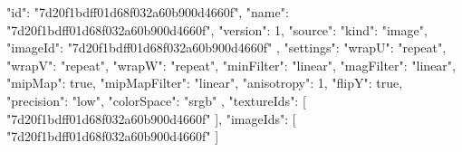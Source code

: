 {
  "id": "7d20f1bdff01d68f032a60b900d4660f",
  "name": "7d20f1bdff01d68f032a60b900d4660f",
  "version": 1,
  "source": {
    "kind": "image",
    "imageId": "7d20f1bdff01d68f032a60b900d4660f"
  },
  "settings": {
    "wrapU": "repeat",
    "wrapV": "repeat",
    "wrapW": "repeat",
    "minFilter": "linear",
    "magFilter": "linear",
    "mipMap": true,
    "mipMapFilter": "linear",
    "anisotropy": 1,
    "flipY": true,
    "precision": "low",
    "colorSpace": "srgb"
  },
  "textureIds": [
    "7d20f1bdff01d68f032a60b900d4660f"
  ],
  "imageIds": [
    "7d20f1bdff01d68f032a60b900d4660f"
  ]
}
